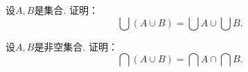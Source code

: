 \begin{example}
设\(A,B\)是集合.
证明：\begin{equation}
	\bigcup(A \cup B) = \bigcup A \cup \bigcup B.
\end{equation}
\end{example}

\begin{example}
设\(A,B\)是非空集合.
证明：\begin{equation}
	\bigcap(A \cup B) = \bigcap A \cap \bigcap B.
\end{equation}
\end{example}

